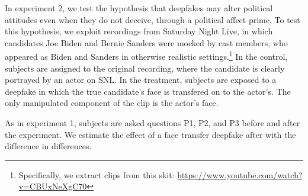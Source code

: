 In experiment 2, we test the hypothesis that deepfakes may alter
political attitudes even when they do not deceive, through a political
affect prime. To test this hypothesis, we exploit recordings from
Saturday Night Live, in which candidates Joe Biden and Bernie Sanders
were mocked by cast members, who appeared as Biden and Sanders in
otherwise realistic settings.\footnote{Specifically, we extract clips
  from this skit:
  \href{https://www.youtube.com/watch?v=CBUxNeXgC70}{https://www.youtube.com/watch?v=CBUxNeXgC70}}
In the control, subjects are assigned to the original recording, where
the candidate is clearly portrayed by an actor on SNL. In the
treatment, subjects are exposed to a deepfake in which the true
candidate's face is transfered on to the actor's. The only manipulated
component of the clip is the actor's face.

As in experiment 1, subjects are asked questions P1, P2, and P3 before
and after the experiment. We estimate the effect of a face transfer
deepfake after with the difference in differences.
